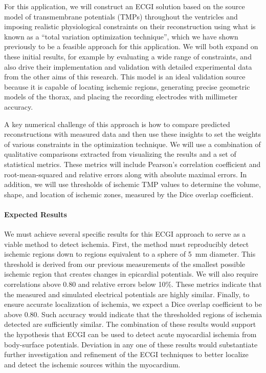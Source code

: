 For this application, we will construct an ECGI solution based on the
source model of transmembrane potentials (TMPs) throughout the ventricles
and imposing realistic physiological constraints on their reconstruction
using what is known as a ``total variation optimization technique'', which
we have shown previously to be a feasible approach for this
application. \cite{RSM:Wan2011b,RSM:Wan2013} We will both expand on these
initial results, for example by evaluating a wide range of constraints, and
also drive their implementation and validation with detailed experimental
data from the other aims of this research. This model is an ideal
validation source because it is capable of locating ischemic regions,
generating precise geometric models of the thorax, and placing the
recording electrodes with millimeter accuracy. 

A key numerical challenge of this approach is how to compare predicted
reconstructions with measured data and then use these insights to set the
weights of various constraints in the optimization technique.  We will use
a combination of qualitative comparisons extracted from visualizing the
results and a set of statistical metrics. These metrics will include
Pearson's correlation coefficient and root-mean-squared and relative errors
along with absolute maximal errors.  In addition, we will use thresholds of
ischemic TMP values to determine the volume, shape, and location of
ischemic zones, measured by the Dice overlap coefficient.


\paragraph{Expected Results} We must achieve several specific results for
this ECGI approach to serve as a viable method to detect ischemia. First,
the method must reproducibly detect ischemic regions down to regions
equivalent to a sphere of 5~mm diameter. This threshold is derived from our
previous measurements of the smallest possible ischemic region that creates
changes in epicardial potentials.  We will also require correlations above
0.80 and relative errors below 10\%. These metrics indicate that the
measured and simulated electrical potentials are highly similar. Finally,
to ensure accurate localization of ischemia, we expect a Dice overlap
coefficient to be above 0.80. Such accuracy would indicate that the
thresholded regions of ischemia detected are sufficiently similar. The
combination of these results would support the hypothesis that ECGI can be
used to detect acute myocardial ischemia from body-surface
potentials. Deviation in any one of these results would substantiate
further investigation and refinement of the ECGI techniques to better
localize and detect the ischemic sources within the myocardium.

